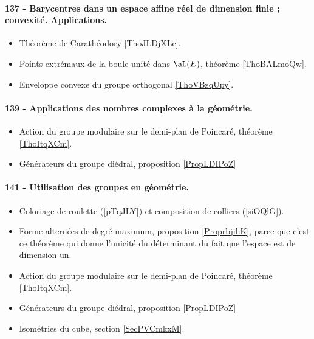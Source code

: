 \paragraph{137 - Barycentres dans un espace affine réel de dimension finie ; convexité. Applications.}
\begin{itemize}
    \item Théorème de Carathéodory \ref{ThoJLDjXLe}.
    \item Points extrémaux de la boule unité dans \( \aL(E)\), théorème \ref{ThoBALmoQw}.
    \item Enveloppe convexe du groupe orthogonal \ref{ThoVBzqUpy}.
\end{itemize}
\paragraph{139 - Applications des nombres complexes à la géométrie.}
\begin{itemize}
    \item Action du groupe modulaire sur le demi-plan de Poincaré, théorème \ref{ThoItqXCm}.
    \item Générateurs du groupe diédral, proposition \ref{PropLDIPoZ}
\end{itemize}
\paragraph{141 - Utilisation des groupes en géométrie.}
\begin{itemize}
    \item Coloriage de roulette (\ref{pTqJLY}) et composition de colliers (\ref{siOQlG}).
    \item Forme alternées de degré maximum, proposition \ref{ProprbjihK}, parce que c'est ce théorème qui donne l'unicité du déterminant du fait que l'espace est de dimension un.
    \item Action du groupe modulaire sur le demi-plan de Poincaré, théorème \ref{ThoItqXCm}.
    \item Générateurs du groupe diédral, proposition \ref{PropLDIPoZ}
    \item Isométries du cube, section \ref{SecPVCmkxM}.
\end{itemize}
